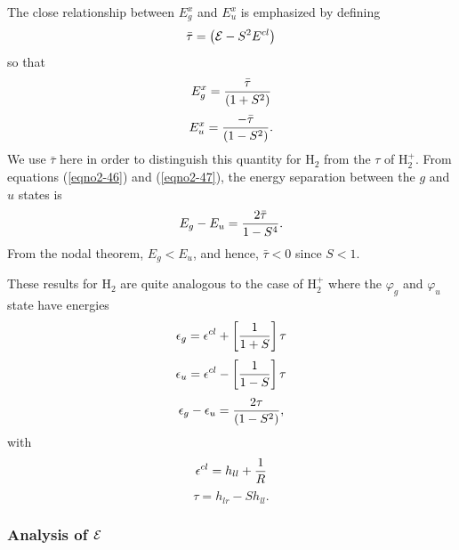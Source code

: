 The close relationship between $E_g^x$ and $E_u^x$ is emphasized by defining
\begin{equation}
{\bar{\tau}} = \left( {\cal E} - S^2 E^{cl} \right)
\label{eqno2-45}
\end{equation}
so that
\begin{equation}
E^x_g = {{\bar{\tau}} \over \left( 1 + S^2 \right)}
\label{eqno2-46}
\end{equation}
\begin{equation}
E^x_u = {- {\bar{\tau}} \over \left( 1 - S^2 \right)} .
\label{eqno2-47}
\end{equation}
We use ${\bar{\tau}}$ here in order to distinguish this quantity for
H$_2$ from the $\tau$ of H$^+_2$.  From equations (\ref{eqno2-46}) and
(\ref{eqno2-47}), the energy separation between the $g$ and $u$ states
is
\begin{equation}
E_g - E_u = {2 {\bar{\tau}} \over 1 - S^4}.
\label{eqno2-48}
\end{equation}
From the nodal theorem, $E_g < E_u$, and hence, ${\bar{\tau}} < 0$ since 
$S < 1$.
    
These results for H$_2$ are quite analogous to the case of H$^+_2$ where the
$\varphi_g$ and $\varphi_u$ state have energies
\begin{equation}
\epsilon_g = \epsilon^{cl} + \left[ {1 \over 1+S} \right]\tau
\end{equation}
\begin{equation}
\epsilon_u = \epsilon^{cl} - \left[ {1 \over 1-S} \right]\tau
\end{equation}
\begin{equation}
\epsilon_g - \epsilon_u = {2 \tau \over ( 1 - S^2)} ,
\end{equation}
with
\begin{equation}
\epsilon^{cl} = h_{ll} + {1 \over R}
\label{eqno2-49}
\end{equation}
\begin{equation}
\tau = h_{lr} - Sh_{ll}.
\end{equation}

\subsubsection{Analysis of ${\cal E}$}

